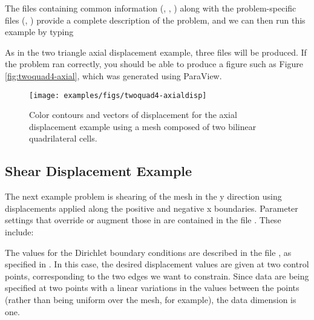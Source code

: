 The files containing common information (,
, ) along with
the problem-specific files (,
) provide a complete description of the
problem, and we can then run this example by typing
As in the two triangle axial displacement example, three files will be
produced. If the problem ran correctly, you should be able to produce
a figure such as Figure \vref{fig:twoquad4-axial}, which was generated
using ParaView.

\begin{figure}[htbp]
\texttt{[image: examples/figs/twoquad4-axialdisp]}
\caption{Color contours and vectors of displacement for the axial displacement
  example using a mesh composed of two bilinear quadrilateral cells.}
\label{fig:twoquad4-axial}
\end{figure}


\subsection{Shear Displacement Example}

The next example problem is shearing of the mesh in the y direction
using displacements applied along the positive and negative x
boundaries.  Parameter settings that override or augment those in
 are contained in the file
. These include:
\begin{inventory}
\end{inventory}
The values for the Dirichlet boundary conditions are described in the
file , as specified in
.  In this case, the desired displacement
values are given at two control points, corresponding to the two edges
we want to constrain. Since data are being specified at two points
with a linear variations in the values between the points (rather than
being uniform over the mesh, for example), the data dimension is one.

